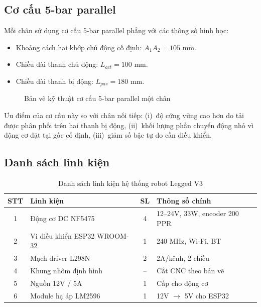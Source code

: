 \subsection{Cơ cấu 5-bar parallel}

Mỗi chân sử dụng cơ cấu 5-bar parallel phẳng với các thông số hình học:
\begin{itemize}
    \item Khoảng cách hai khớp chủ động cố định: $A_1A_2 = 105$ mm.
    \item Chiều dài thanh chủ động: $L_{act} = 100$ mm.
    \item Chiều dài thanh bị động: $L_{pas} = 180$ mm.
\end{itemize}

\begin{figure}[H]
    \centering
    \caption{Bản vẽ kỹ thuật cơ cấu 5-bar parallel một chân}
    \label{fig:five_bar_cad}
\end{figure}

Ưu điểm của cơ cấu này so với chân nối tiếp: (i)~độ cứng vững cao hơn do tải
được phân phối trên hai thanh bị động, (ii)~khối lượng phần chuyển động nhỏ vì
động cơ đặt tại gốc cố định, (iii)~giảm số bậc tự do cần điều khiển.

\subsection{Danh sách linh kiện}

\begin{table}[H]
    \centering
    \caption{Danh sách linh kiện hệ thống robot Legged V3}
    \label{tab:bom}
    \begin{tabular}{|c|p{5cm}|c|p{4.5cm}|}
    \hline
    \textbf{STT} & \textbf{Linh kiện} & \textbf{SL} & \textbf{Thông số chính} \\
    \hline
    1 & Động cơ DC NF5475 & 4 & 12--24V, 33W, encoder 200 PPR \\
    \hline
    2 & Vi điều khiển ESP32 WROOM-32 & 1 & 240 MHz, Wi-Fi, BT \\
    \hline
    3 & Mạch driver L298N & 2 & 2A/kênh, 2 chiều \\
    \hline
    4 & Khung nhôm định hình & -- & Cắt CNC theo bản vẽ \\
    \hline
    5 & Nguồn 12V / 5A & 1 & Cấp cho động cơ \\
    \hline
    6 & Module hạ áp LM2596 & 1 & 12V $\to$ 5V cho ESP32 \\
    \hline
    \end{tabular}
\end{table}


